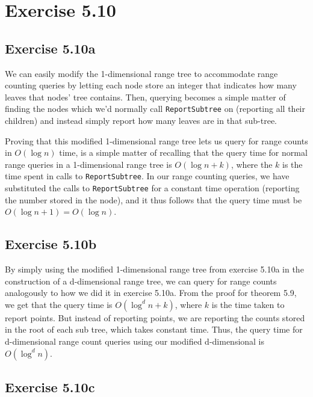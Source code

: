 \documentclass[11pt,a4paper]{article}
\begin{document}
\section{Exercise 5.10}

\subsection{Exercise 5.10a}

We can easily modify the 1-dimensional range tree to accommodate range
counting queries by letting each node store an integer that indicates
how many leaves that nodes' tree contains. Then, querying becomes a
simple matter of finding the nodes which we'd normally call
\verb+ReportSubtree+ on (reporting all their children) and instead
simply report how many leaves are in that sub-tree.

Proving that this modified 1-dimensional range tree lets us query for
range counts in $O(\log n)$ time, is a simple matter of recalling that
the query time for normal range queries in a 1-dimensional range tree
is $O(\log n + k)$, where the $k$ is the time spent in calls to
\verb+ReportSubtree+. In our range counting queries, we have
substituted the calls to \verb+ReportSubtree+ for a constant time
operation (reporting the number stored in the node), and it thus
follows that the query time must be $O(\log n + 1) = O(\log n)$.

\subsection{Exercise 5.10b}

By simply using the modified 1-dimensional range tree from exercise
5.10a in the construction of a d-dimensional range tree, we can query
for range counts analogously to how we did it in exercise 5.10a. From
the proof for theorem 5.9, we get that the query time is $O(\log^d n +
k)$, where $k$ is the time taken to report points. But instead of
reporting points, we are reporting the counts stored in the root of
each sub tree, which takes constant time. Thus, the query time for
d-dimensional range count queries using our modified d-dimensional is
$O(\log^d n)$.

\subsection{Exercise 5.10c}
\end{document}
